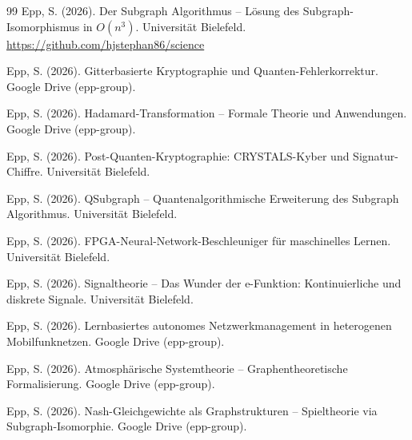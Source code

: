 ﻿\documentclass[a4paper,12pt]{article}
\theoremstyle{definition}
\begin{document}
\begin{thebibliography}{99}
Epp, S. (2026).
Der Subgraph Algorithmus -- L\"osung des Subgraph-Isomorphismus in $O(n^3)$.
Universit\"at Bielefeld.
\url{https://github.com/hjstephan86/science}

Epp, S. (2026).
Gitterbasierte Kryptographie und Quanten-Fehlerkorrektur.
Google Drive (epp-group).

Epp, S. (2026).
Hadamard-Transformation -- Formale Theorie und Anwendungen.
Google Drive (epp-group).

Epp, S. (2026).
Post-Quanten-Kryptographie: CRYSTALS-Kyber und Signatur-Chiffre.
Universit\"at Bielefeld.

Epp, S. (2026).
QSubgraph -- Quantenalgorithmische Erweiterung des Subgraph Algorithmus.
Universit\"at Bielefeld.

Epp, S. (2026).
FPGA-Neural-Network-Beschleuniger f\"ur maschinelles Lernen.
Universit\"at Bielefeld.

Epp, S. (2026).
Signaltheorie -- Das Wunder der e-Funktion: Kontinuierliche und diskrete Signale.
Universit\"at Bielefeld.

Epp, S. (2026).
Lernbasiertes autonomes Netzwerkmanagement in heterogenen Mobilfunknetzen.
Google Drive (epp-group).

Epp, S. (2026).
Atmosph\"arische Systemtheorie -- Graphentheoretische Formalisierung.
Google Drive (epp-group).

Epp, S. (2026).
Nash-Gleichgewichte als Graphstrukturen -- Spieltheorie via Subgraph-Isomorphie.
Google Drive (epp-group).

\end{thebibliography}
\end{document}
